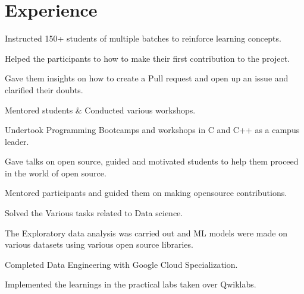 \documentclass[]{deedy-resume-openfont}
\begin{document}
      \section{Experience}
      \hfill {}
          \begin{tightemize}
  \item Instructed 150+ students of multiple batches to reinforce learning concepts.
\end{tightemize}
          \sectionsep
      \hfill {}
          \begin{tightemize}
  \item Helped the participants to how to make their first contribution to the project.
  \item Gave them insights on how to create a Pull request and open up an issue and clarified their doubts.
\end{tightemize}
          \sectionsep
      \hfill {}
          \begin{tightemize}
  \item Mentored students \& Conducted various workshops.
  \item Undertook Programming Bootcamps and workshops in C and C++ as a campus leader.
  \item Gave talks on open source, guided and motivated students to help them proceed in the world of open source.
\end{tightemize}
          \sectionsep
      \hfill {}
          \begin{tightemize}
  \item Mentored participants and guided them on making opensource contributions.
\end{tightemize}
          \sectionsep
      \hfill {}
          \begin{tightemize}
  \item Solved the Various tasks related to Data science.
  \item The Exploratory data analysis was carried out and ML models were made on various datasets using various open source libraries.
\end{tightemize}
          \sectionsep
      \hfill {}
          \begin{tightemize}
  \item Completed Data Engineering with Google Cloud Specialization.
  \item Implemented the learnings in the practical labs taken over Qwiklabs.
\end{tightemize}
          \sectionsep
%
%
\end{document}
